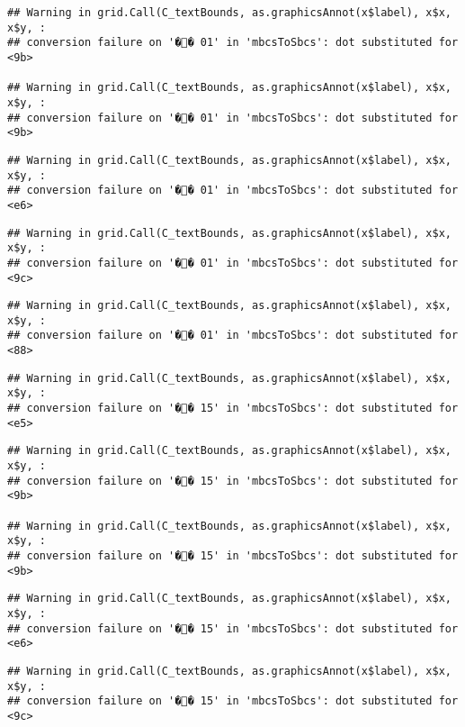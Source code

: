 \documentclass[]{article}
\begin{document}
\begin{verbatim}
## Warning in grid.Call(C_textBounds, as.graphicsAnnot(x$label), x$x, x$y, :
## conversion failure on '�� 01' in 'mbcsToSbcs': dot substituted for <9b>

## Warning in grid.Call(C_textBounds, as.graphicsAnnot(x$label), x$x, x$y, :
## conversion failure on '�� 01' in 'mbcsToSbcs': dot substituted for <9b>
\end{verbatim}

\begin{verbatim}
## Warning in grid.Call(C_textBounds, as.graphicsAnnot(x$label), x$x, x$y, :
## conversion failure on '�� 01' in 'mbcsToSbcs': dot substituted for <e6>
\end{verbatim}

\begin{verbatim}
## Warning in grid.Call(C_textBounds, as.graphicsAnnot(x$label), x$x, x$y, :
## conversion failure on '�� 01' in 'mbcsToSbcs': dot substituted for <9c>
\end{verbatim}

\begin{verbatim}
## Warning in grid.Call(C_textBounds, as.graphicsAnnot(x$label), x$x, x$y, :
## conversion failure on '�� 01' in 'mbcsToSbcs': dot substituted for <88>
\end{verbatim}

\begin{verbatim}
## Warning in grid.Call(C_textBounds, as.graphicsAnnot(x$label), x$x, x$y, :
## conversion failure on '�� 15' in 'mbcsToSbcs': dot substituted for <e5>
\end{verbatim}

\begin{verbatim}
## Warning in grid.Call(C_textBounds, as.graphicsAnnot(x$label), x$x, x$y, :
## conversion failure on '�� 15' in 'mbcsToSbcs': dot substituted for <9b>

## Warning in grid.Call(C_textBounds, as.graphicsAnnot(x$label), x$x, x$y, :
## conversion failure on '�� 15' in 'mbcsToSbcs': dot substituted for <9b>
\end{verbatim}

\begin{verbatim}
## Warning in grid.Call(C_textBounds, as.graphicsAnnot(x$label), x$x, x$y, :
## conversion failure on '�� 15' in 'mbcsToSbcs': dot substituted for <e6>
\end{verbatim}

\begin{verbatim}
## Warning in grid.Call(C_textBounds, as.graphicsAnnot(x$label), x$x, x$y, :
## conversion failure on '�� 15' in 'mbcsToSbcs': dot substituted for <9c>
\end{verbatim}
\end{document}
